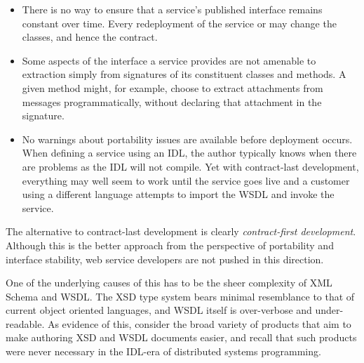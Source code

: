 \begin{itemize}

\item
    
There is no way to ensure that a service's published interface remains constant
over time. Every redeployment of the service or may change the classes, and
hence the contract.

\item

Some aspects of the interface a service provides are not amenable to
extraction simply from signatures of its constituent classes and
methods. A given method might, for example, choose to extract
attachments from messages programmatically, without declaring that
attachment in the signature.

\item

No warnings about portability issues are available before deployment
occurs. When defining a service using an IDL, the author typically
knows when there are problems as the IDL will not compile. Yet with
contract-last development, everything may well seem to work until the
service goes live and a customer using a different language attempts
to import the WSDL and invoke the service.
    
\end{itemize}

The alternative to contract-last development is clearly \emph{contract-first
development}. Although this is the better approach from the perspective
of portability and interface stability, web service developers are not
pushed in this direction.

One of the underlying causes of this has to be the sheer complexity of
XML Schema and WSDL. The XSD type system bears minimal resemblance to
that of current object oriented languages, and WSDL itself is
over-verbose and under-readable. As evidence of this, consider the
broad variety of products that aim to make authoring XSD and WSDL
documents easier, and recall that such products were never necessary
in the IDL-era of distributed systems programming.



